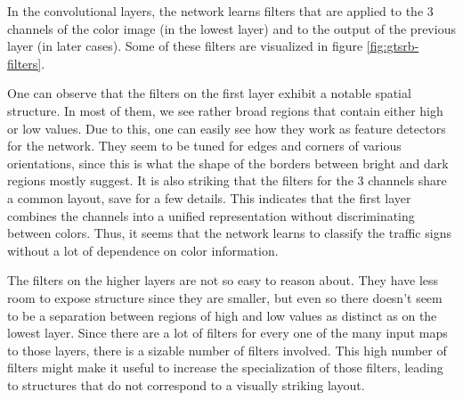 \documentclass[11pt, a4paper]{article}
\begin{document}
In the convolutional layers, the network learns filters that are applied to the 3 channels of the color image (in the lowest layer) and to the output of the previous layer (in later cases). Some of these filters are visualized in figure \ref{fig:gtsrb-filters}.

One can observe that the filters on the first layer exhibit a notable spatial structure. In most of them, we see rather broad regions that contain either high or low values. Due to this, one can easily see how they work as feature detectors for the network. They seem to be tuned for edges and corners of various orientations, since this is what the shape of the borders between bright and dark regions mostly suggest. It is also striking that the filters for the 3 channels share a common layout, save for a few details. This indicates that the first layer combines the channels into a unified representation without discriminating between colors. Thus, it seems that the network learns to classify the traffic signs without a lot of dependence on color information. %

The filters on the higher layers are not so easy to reason about. They have less room to expose structure since they are smaller, but even so there doesn't seem to be a separation between regions of high and low values as distinct as on the lowest layer. Since there are a lot of filters for every one of the many input maps to those layers, there is a sizable number of filters involved. This high number of filters might make it useful to increase the specialization of those filters, leading to structures that do not correspond to a visually striking layout. %
\end{document}
